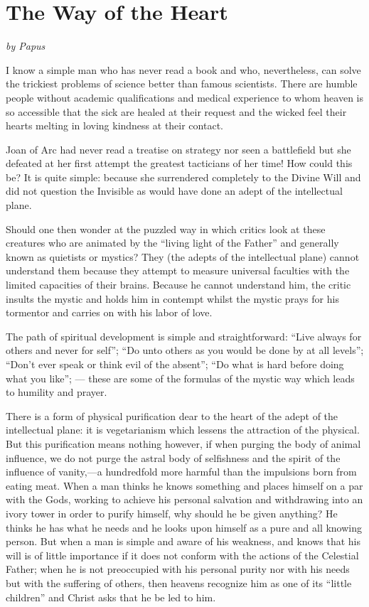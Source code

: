 \section{The Way of the Heart}

\textit{by Papus}

I know a simple man who has never read a book and who, nevertheless, can solve the
trickiest problems of science better than famous scientists. There are humble people
without academic qualifications and medical experience to whom heaven is so accessible that
the sick are healed at their request and the wicked feel their hearts melting in loving
kindness at their contact.

Joan of Arc had never read a treatise on strategy nor seen a battlefield but she defeated
at her first attempt the greatest tacticians of her time! How could this be? It is quite simple:
because she surrendered completely to the Divine Will and did not question the Invisible as
would have done an adept of the intellectual plane.

Should one then wonder at the puzzled way in which critics look at these creatures who
are animated by the ``living light of the Father'' and generally known as quietists or mystics?
They (the adepts of the intellectual plane) cannot understand them because they attempt to
measure universal faculties with the limited capacities of their brains. Because he cannot
understand him, the critic insults the mystic and holds him in contempt whilst the mystic
prays for his tormentor and carries on with his labor of love.

The path of spiritual development is simple and straightforward: ``Live always for
others and never for self''; ``Do unto others as you would be done by at all levels''; ``Don't
ever speak or think evil of the absent''; ``Do what is hard before doing what you like''; —
these are some of the formulas of the mystic way which leads to humility and prayer.

There is a form of physical purification dear to the heart of the adept of the intellectual
plane: it is vegetarianism which lessens the attraction of the physical. But this purification
means nothing however, if when purging the body of animal influence, we do not purge the
astral body of selfishness and the spirit of the influence of vanity,—a hundredfold more
harmful than the impulsions born from eating meat. When a man thinks he knows
something and places himself on a par with the Gods, working to achieve his personal
salvation and withdrawing into an ivory tower in order to purify himself, why should he be
given anything? He thinks he has what he needs and he looks upon himself as a pure and all
knowing person. But when a man is simple and aware of his weakness, and knows that his
will is of little importance if it does not conform with the actions of the Celestial Father;
when he is not preoccupied with his personal purity nor with his needs but with the
suffering of others, then heavens recognize him as one of its ``little children'' and Christ
asks that he be led to him.

